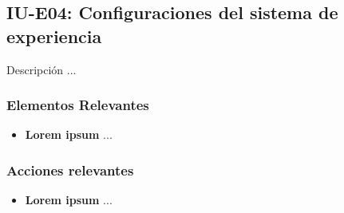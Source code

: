 
\subsection{IU-E04: Configuraciones del sistema de experiencia}

 Descripción ...


\subsubsection{Elementos Relevantes}

    \begin{itemize}
    \item {\bf Lorem ipsum}
        ...
    \end{itemize}

\subsubsection{Acciones relevantes}

    \begin{itemize}
    \item {\bf Lorem ipsum}
        ...
    \end{itemize}

\clearpage

